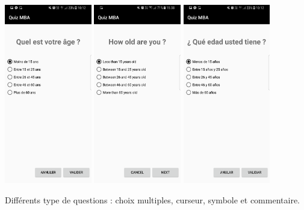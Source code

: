 \documentclass[12]{report}
\begin{document}
  \begin{center}
    \includegraphics[width=3.8cm]{age_fr.png}
    \includegraphics[width=3.8cm]{age_an.png}
    \includegraphics[width=3.8cm]{age_es.png}
  \end{center}

  Différents type de questions : choix multiples, curseur, symbole et commentaire. \\
\end{document}
